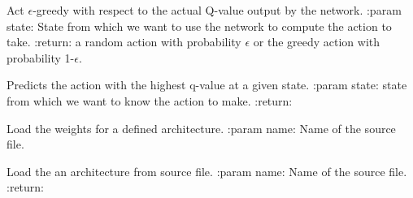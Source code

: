 \documentclass[letterpaper,10pt,english]{sphinxmanual}
\begin{document}
\begin{fulllineitems}
\begin{quote}
\begin{description}
\begin{itemize}
\end{itemize}

\end{description}\end{quote}

\begin{fulllineitems}
\label{\detokenize{package2:dqn.DQNAgent.act}}
Act \(\epsilon\)-greedy with respect to the actual Q-value output by the network.
:param state: State from which we want to use the network to compute the action to take.
:return: a random action with probability \(\epsilon\) or the greedy action with probability 1-\(\epsilon\).

\end{fulllineitems}


\begin{fulllineitems}
\label{\detokenize{package2:dqn.DQNAgent.actDeterministically}}
Predicts the action with the highest q-value at a given state.
:param state: state from which we want to know the action to make.
:return:

\end{fulllineitems}


\begin{fulllineitems}
\label{\detokenize{package2:dqn.DQNAgent.load}}
Load the weights for a defined architecture.
:param name: Name of the source file.

\end{fulllineitems}


\begin{fulllineitems}
\label{\detokenize{package2:dqn.DQNAgent.loadModel}}
Load the an architecture from source file.
:param name: Name of the source file.
:return:

\end{fulllineitems}



\end{fulllineitems}
\end{document}
